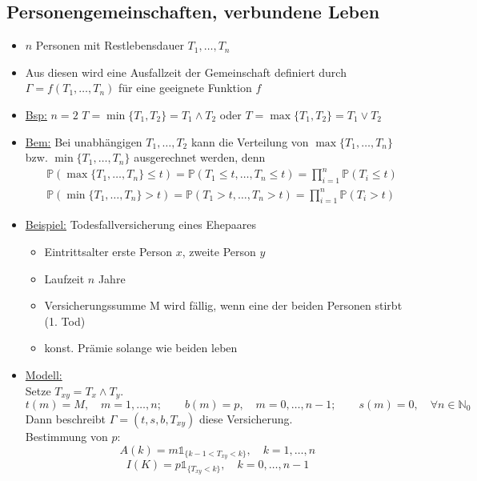 \subsection{Personengemeinschaften, verbundene Leben}
\label{sub:verbundene_leben}
\begin{itemize}
	\item $n$ Personen mit Restlebensdauer $T_1,\dots,T_n$
	\item Aus diesen wird eine Ausfallzeit der Gemeinschaft definiert durch $\Gamma=f(T_1,\dots,T_n)$ für eine geeignete Funktion $f$
	\item \uline{Bsp:} $n=2$ $T=\min\{T_1,T_2\}=T_1\land T_2$ oder $T=\max\{T_1,T_2\}=T_1\lor T_2$
	\item \uline{Bem:} Bei unabhängigen $T_1,\dots,T_2$ kann die Verteilung von $\max\{T_1,\dots,T_n\}$ bzw. $\min\{T_1,\dots,T_n\}$ ausgerechnet werden, denn
	\begin{equation*}
	\begin{aligned}
		&\mathds{P}(\max\{T_1,\dots,T_n\}\le t)=\mathds{P}(T_1\le t,\dots,T_n\le t)=\prod_{i=1}^{n}\mathds{P}(T_i\le t)\\
		&\mathds{P}(\min\{T_1,\dots,T_n\}>t)=\mathds{P}(T_1>t,\dots,T_n>t)=\prod_{i=1}^{n}\mathds{P}(T_i>t)
	\end{aligned}
	\end{equation*}
	\item \uline{Beispiel:} Todesfallversicherung eines Ehepaares
	\begin{itemize}
		\item Eintrittsalter erste Person $x$, zweite Person $y$
		\item Laufzeit $n$ Jahre
		\item Versicherungssumme M wird fällig, wenn eine der beiden Personen stirbt (1. Tod)
		\item konst. Prämie solange wie beiden leben
	\end{itemize}
	\item \uline{Modell:}\\
	Setze $T_{xy}=T_x\land T_y$.\\
	$t(m)=M,\quad m=1,\dots,n;\qquad b(m)=p, \quad m=0,\dots,n-1;\qquad s(m)=0,\quad \forall n\in \mathds{N}_0$\\
	Dann beschreibt $\Gamma=(t,s,b,T_{xy})$ diese Versicherung.\\
	Bestimmung von $p$:\\
	\[A(k)=m\mathbb{1}_{\{k-1<T_{xy}<k\}}, \quad k=1,\dots,n\]
	\[I(K)=p\mathbb{1}_{\{T_{xy}<k\}}, \quad k=0,\dots,n-1\]

\end{itemize}
